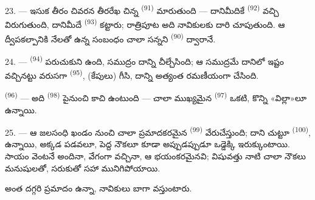 23. --- ఇసుక తీరం చివరన తీరరేఖ చిన్న  \textsuperscript{(91)}
 మారుతుంది — దానిమీదికే  \textsuperscript{(92)} వచ్చి
విరుగుతుంది, దానిమీదే  \textsuperscript{(93)} కట్టారు; రాత్రిపూట అది
నావికులకు దారి చూపుతుంది. ఆ ద్వీపకల్పానికి నేలతో ఉన్న సంబంధం చాలా సన్నని
 \textsuperscript{(90)} ద్వారానే.

\VUsaut{5.0mm}
\VUsaut{3.4mm}

24. ---  \textsuperscript{(94)} పరుచుకుని ఉంది, సముద్రం దాన్ని చీల్చేసింది;
ఆ సముద్రమే దానిలో ఇష్టం వచ్చినట్టు వరుసగా  \textsuperscript{(95)},
 (కేపులు) గీసి, దాన్ని అత్యంత రమణీయంగా చేసింది.

 \textsuperscript{(96)} — అది  \textsuperscript{(98)}
పైనుంచి కాచి ఉంటుంది — చాలా ముఖ్యమైన  \textsuperscript{(97)} ఒకటి, కొన్ని
«విల్లా»లూ ఉన్నాయి.

25. --- ఆ జలసంధి ఖండం నుంచి చాలా ప్రమాదకరమైన  \textsuperscript{(99)}
వేరుచేస్తుంది; దాని చుట్టూ  \textsuperscript{(100)},
 ఉన్నాయి, అక్కడ పడవలూ, పెద్ద నౌకలూ కూడా అప్పుడప్పుడూ
ఒడ్డెక్కి ఇరుక్కుంటాయి. సాయం వెంటనే అందినా,  వేగంగా వచ్చినా, ఆ
 భయంకరమైనవి; విషువత్తు నాటి  చాలా నౌకలు
మనుషులతో, సరుకుతో సహా మునిగిపోయాయి.

అంత దగ్గరి ప్రమాదం ఉన్నా,  నావికులు బాగా వస్తుంటారు.

\VUsaut{6.0mm}
\VUfilet{22mm}
